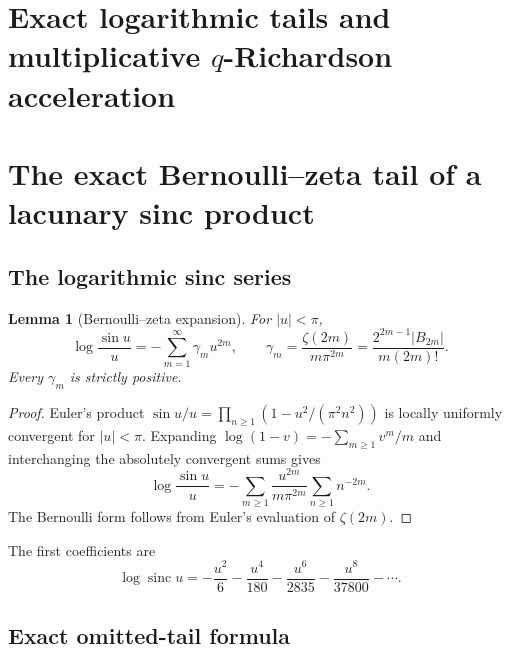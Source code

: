 \documentclass[11pt]{article}
\numberwithin{equation}{section}
\newtheorem{lemma}[theorem]{Lemma}
\theoremstyle{definition}
\theoremstyle{remark}
\newcommand{\sinc}{\operatorname{sinc}}
\begin{document}
\section{Exact logarithmic tails and multiplicative \texorpdfstring{$q$}{q}-Richardson acceleration}

\section{The exact Bernoulli--zeta tail of a lacunary sinc product}
\label{p8:sec:tail}

\subsection{The logarithmic sinc series}

\begin{lemma}[Bernoulli--zeta expansion]
\label{p8:lem:logsinc}
For $|u|<\pi$,
\begin{equation}
\log\frac{\sin u}{u}
=-\sum_{m=1}^{\infty}\gamma_m u^{2m},
\qquad
\gamma_m=\frac{\zeta(2m)}{m\pi^{2m}}
=\frac{2^{2m-1}|B_{2m}|}{m(2m)!}.
\label{p8:eq:logsinc}
\end{equation}
Every $\gamma_m$ is strictly positive.
\end{lemma}

\begin{proof}
Euler's product
\(
\sin u/u=\prod_{n\ge1}(1-u^2/(\pi^2n^2))
\)
is locally uniformly convergent for $|u|<\pi$. Expanding $\log(1-v)=-\sum_{m\ge1}v^m/m$ and interchanging the absolutely convergent sums gives
\[
\log\frac{\sin u}{u}
=-\sum_{m\ge1}\frac{u^{2m}}{m\pi^{2m}}
\sum_{n\ge1}n^{-2m}.
\]
The Bernoulli form follows from Euler's evaluation of $\zeta(2m)$.
\end{proof}

The first coefficients are
\begin{equation}
\log\sinc u=-\frac{u^2}{6}-\frac{u^4}{180}
-\frac{u^6}{2835}-\frac{u^8}{37800}-\cdots.
\label{p8:eq:logsinc-first}
\end{equation}

\subsection{Exact omitted-tail formula}
\end{document}
